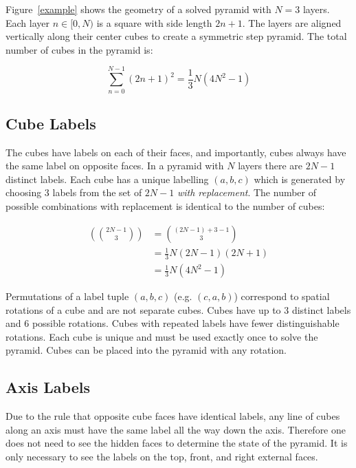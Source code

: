 \documentclass[conference]{IEEEtran}
\begin{document}
Figure~\ref{example} shows the geometry of a solved pyramid with $N=3$ layers.
Each layer $n\in[0,N)$ is a square with side length $2n+1$.
The layers are aligned vertically along their center cubes to create a symmetric step pyramid. The total number of cubes in the pyramid is:

\begin{equation}
\sum_{n=0}^{N-1}(2n+1)^2 = \frac{1}{3}N(4N^2-1)
\end{equation}

\subsection{Cube Labels}

The cubes have labels on each of their faces, and importantly, cubes always have the same label on opposite faces.
In a pyramid with $N$ layers there are $2N-1$ distinct labels.
Each cube has a unique labelling $(a,b,c)$ which is generated by choosing 3 labels from the set of $2N-1$ \emph{with replacement}.
The number of possible combinations with replacement is identical to the number of cubes:

\begin{equation}
\begin{aligned}
\left(\binom{2N-1}{3}\right) &= \binom{(2N-1)+3-1}{3} \\
&= \frac{1}{3}N(2N-1)(2N+1) \\
&= \frac{1}{3}N(4N^2-1)
\end{aligned}
\end{equation}

Permutations of a label tuple $(a,b,c)$ (e.g. $(c,a,b)$) correspond to spatial rotations of a cube and are not separate cubes.
Cubes have up to 3 distinct labels and 6 possible rotations.
Cubes with repeated labels have fewer distinguishable rotations.
Each cube is unique and must be used exactly once to solve the pyramid.
Cubes can be placed into the pyramid with any rotation.

\subsection{Axis Labels}

Due to the rule that opposite cube faces have identical labels, any line of cubes along an axis must have the same label all the way down the axis.
Therefore one does not need to see the hidden faces to determine the state of the pyramid.
It is only necessary to see the labels on the top, front, and right external faces.
\end{document}
